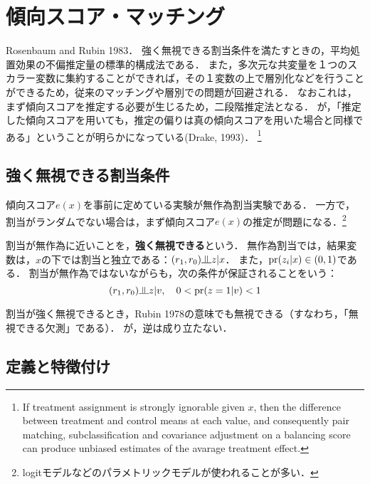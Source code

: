 \documentclass[uplatex,dvipdfmx]{jsreport}
\begin{document}
\section{傾向スコア・マッチング}

\begin{tcolorbox}[colframe=ForestGreen, colback=ForestGreen!10!white,breakable,colbacktitle=ForestGreen!40!white,coltitle=black,fonttitle=\bfseries\sffamily,
title=]
    Rosenbaum and Rubin 1983．
    強く無視できる割当条件を満たすときの，平均処置効果の不偏推定量の標準的構成法である．
    また，多次元な共変量を１つのスカラー変数に集約することができれば，その１変数の上で層別化などを行うことができるため，従来のマッチングや層別での問題が回避される．
    なおこれは，まず傾向スコアを推定する必要が生じるため，二段階推定法となる．
    が，「推定した傾向スコアを用いても，推定の偏りは真の傾向スコアを用いた場合と同様である」ということが明らかになっている(Drake, 1993)．
    \footnote{If treatment assignment is strongly ignorable given $x$, then the difference between treatment and control means at each value, and consequently pair matching, subclassification and covariance adjustment on a balancing score can produce unbiased estimates of the avarage treatment effect.}
\end{tcolorbox}

\subsection{強く無視できる割当条件}

傾向スコア$e(x)$を事前に定めている実験が無作為割当実験である．
一方で，割当がランダムでない場合は，まず傾向スコア$e(x)$の推定が問題になる．\footnote{logitモデルなどのパラメトリックモデルが使われることが多い．}

\begin{definition}
    割当が無作為に近いことを，\textbf{強く無視できる}という．
    無作為割当では，結果変数は，$x$の下では割当と独立である：$(r_1,r_0)\indep z|x$．
    また，$\mathrm{pr}(z_i|x)\in(0,1)$である．
    割当が無作為ではないながらも，次の条件が保証されることをいう：
    \[(r_1,r_0)\indep z|v,\quad 0<\pr(z=1|v)<1\]
\end{definition}

\begin{lemma}
    割当が強く無視できるとき，Rubin 1978の意味でも無視できる（すなわち，「無視できる欠測」である）．
    が，逆は成り立たない．
\end{lemma}

\subsection{定義と特徴付け}
\end{document}
